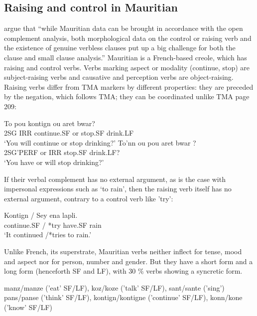 \documentclass[output=paper]{langsci/langscibook}
\begin{document}
\subsection{Raising and control in Mauritian}

\citet[]{HenriandLaurens2011} argue that ``while Mauritian data can be brought in accordance with the open complement analysis, both morphological data on the control or raising verb and the existence of genuine verbless clauses put up a big challenge for both the clause and small clause analysis.''
Mauritian is a French-based creole, which has raising and control verbs. Verbs marking aspect or modality (continue, stop) are subject-raising verbs and causative and perception verbs are object-raising. Raising verbs differ from TMA markers by different properties: they are preceded by the negation, which follows TMA; they can be coordinated unlike TMA \citep{HenriandLaurens2011} page 209:

\begin{exe}
\ex \gll To pou kontign ou aret bwar? \\
2SG IRR continue.SF or stop.SF drink.LF\\
\glt  `You will continue or stop drinking?'
\ex \gll *To’nn ou pou aret bwar ? \\
 2SG’PERF or IRR stop.SF drink.LF?\\
 \glt  `You have or will stop drinking?'
 \end{exe}
 
If their verbal complement has no external argument, as is the case with impersonal expressions such as  ‘to rain’, then the raising verb itself has no external argument, contrary to a control verb like  'try':

\begin{exe}
\ex \gll Kontign / Sey ena lapli. \\
continue.SF / *try have.SF rain \\
\glt ‘It continued /*tries to rain.’
\end{exe}

Unlike French, its superstrate, Mauritian verbs neither inflect for tense, mood and aspect nor for person, number and
gender. But they have a short form and a long form (henceforth SF and LF), with 30 \% verbs showing a syncretic form.

\begin{exe}
\ex \begin{xlist}
\ex manz/manze ('eat' SF/LF), koz/koze ('talk' SF/LF), sant/sante ('sing')\\
\ex pans/panse ('think' SF/LF), kontign/kontigne ('continue' SF/LF), konn/kone ('know' SF/LF)
\end{xlist}
\end{exe}
\end{document}
